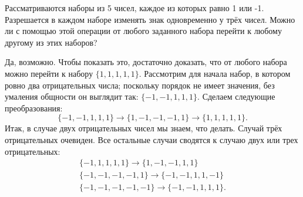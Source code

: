 
\begin{itemize}
\itB Рассматриваются наборы из 5 чисел, каждое из которых равно 1 или -1. Разрешается в 
каждом наборе изменять знак одновременно у трёх чисел. Можно ли с помощью этой операции 
от любого заданного набора перейти к любому другому из этих наборов?

\itr Да, возможно. Чтобы показать это, достаточно доказать, что от любого набора можно 
перейти к набору $\{1,1,1,1,1\}$. Рассмотрим для начала набор, в котором ровно два 
отрицательных числа; поскольку порядок не имеет значения, без умаления общности он 
выглядит так: $\{-1,-1,1,1,1\}$. Сделаем следующие преобразования:
$$
\{-1,-1,1,1,1\}\to \{1,-1,-1,-1,1\}\to \{1,1,1,1,1\}.
$$
Итак, в случае двух отрицательных чисел мы знаем, что делать. Случай трёх отрицательных 
очевиден. Все остальные случаи сводятся к случаю двух или трех отрицательных:
$$\begin{array}{l}
\{-1,1,1,1,1\}\to \{1,-1,-1,1,1\} \\
\{-1,-1,-1,-1,1\}\to \{-1,-1,1,1,-1\} \\
\{-1,-1,-1,-1,-1\}\to  \{-1,-1,1,1,1\}.
\end{array}$$

%
%
\end{itemize}
